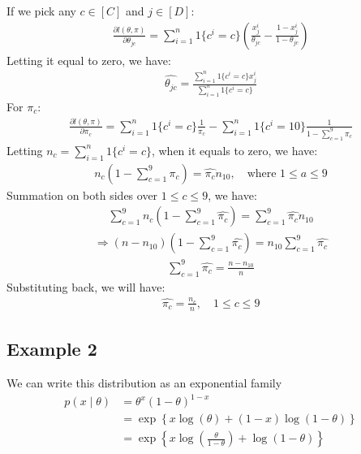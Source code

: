 If we pick any $c \in [C]$ and $j \in [D]$:
\begin{align}
    \frac{\partial l(\theta, \pi)}{\partial \theta_{jc}} = \sum_{i = 1}^{n} 1\{ c^i = c \} \left( \frac{x_j^i}{\theta_{jc}} - \frac{1-x_j^i}{1-\theta_{jc}} \right)
\end{align}
Letting it equal to zero, we have:
\begin{align}
    \hat{\theta_{jc}} = \frac{\sum_{i = 1}^{n} 1\{ c^i = c \} x_j^i}{\sum_{i = 1}^{n} 1\{ c^i = c \}}
\end{align}
For $\pi_c$:
\begin{align}
    \frac{\partial l(\theta, \pi)}{\partial \pi_c} = \sum_{i = 1}^{n} 1\{ c^i = c \} \frac{1}{\pi_c} - \sum_{i = 1}^{n} 1\{ c^i = 10 \} \frac{1}{1 - \sum_{c = 1}^{9} \pi_c}
\end{align}
Letting $n_c = \sum_{i = 1}^{n} 1\{ c^i = c \}$, when it equals to zero, we have:
\begin{align}
    n_c (1 - \sum_{c = 1}^{9} \hat{\pi_c}) = \hat{\pi_c} n_{10}, \quad \text{where } 1 \leq a \leq 9
\end{align}
Summation on both sides over $1 \leq c \leq 9$, we have:
\begin{align}
    \sum_{c = 1}^{9} n_c (1 - \sum_{c = 1}^{9} \hat{\pi_c}) = \sum_{c = 1}^{9} \hat{\pi_c} n_{10}
\end{align}
\begin{align}
    \Rightarrow (n - n_{10})(1 - \sum_{c = 1}^{9} \hat{\pi_c}) = n_{10} \sum_{c = 1}^{9} \hat{\pi_c}
\end{align}
\begin{align}
    \sum_{c = 1}^{9} \hat{\pi_c} = \frac{n - n_{10}}{n}
\end{align}
Substituting back, we will have:
\begin{align}
    \hat{\pi_c} = \frac{n_c}{n}, \quad 1 \leq c \leq 9
\end{align}

\subsection{Example 2}
\label{example-2}
We can write this distribution as an exponential family
\begin{align}
p(x \mid \theta) &= \theta^x (1 - \theta)^{1 - x}\\
    &= \exp \left\{ x \log(\theta) + (1 - x) \log(1 - \theta) \right\}\\
    &= \exp \left\{ x \log \left( \frac{\theta}{1 - \theta} \right) + \log(1 - \theta) \right\}
\end{align}

